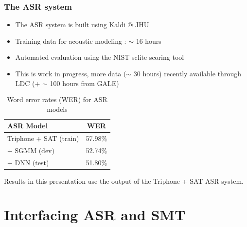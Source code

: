 \documentclass{beamer}
\begin{document}

\begin{frame}
\frametitle{The ASR system}
\begin{itemize}
\item The ASR system is built using Kaldi @ JHU
\item Training data for acoustic modeling : $\sim$ 16 hours 
\item Automated evaluation using the NIST sclite scoring tool
\item This is work in progress, more data ($\sim$ 30 hours) recently available through LDC (+ $\sim$ 100 hours from GALE)
\end{itemize}
\begin{table}
\begin{center}
\begin{tabular}{| l | c |}
  \hline 
  \textbf{ASR Model} & \textbf{WER} \\ \hline
  Triphone + SAT (train) & 57.98\%\\
  \hline
  + SGMM (dev) & 52.74\%\\
  \hline
  + DNN (test) & 51.80\%\\
  \hline
\end{tabular}
\caption{Word error rates (WER) for ASR models}
\label{tab:cross-bleu}
\end{center}
\end{table} 
Results in this presentation use the output of the Triphone + SAT ASR system.
\end{frame}


\section{Interfacing ASR and SMT} %
\end{document}

